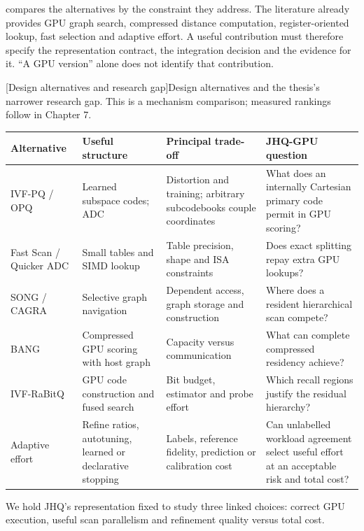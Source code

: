 compares the alternatives by the constraint they
address. The literature already provides GPU graph search, compressed
distance computation, register-oriented lookup, fast selection and adaptive
effort. A useful contribution must therefore specify the representation
contract, the integration decision and the evidence for it. ``A GPU version''
alone does not identify that contribution.

\par\medskip\noindent\begin{minipage}{\linewidth}
\centering\captionsetup{hypcap=false}
[Design alternatives and research gap]{Design alternatives and the thesis's narrower research gap.
This is a mechanism comparison; measured rankings follow in Chapter 7.}
\label{tab:2-position}
\footnotesize\setlength{\tabcolsep}{4pt}
\begin{tabularx}{\linewidth}{@{}>{\raggedright\arraybackslash}p{.20\linewidth}*{3}{>{\raggedright\arraybackslash}X}@{}}
\toprule
Alternative & Useful structure & Principal trade-off & JHQ-GPU question \\
\midrule
IVF-PQ / OPQ & Learned subspace codes; ADC & Distortion and training;
arbitrary subcodebooks couple coordinates & What does an internally
Cartesian primary code permit in GPU scoring? \\
Fast Scan / Quicker ADC & Small tables and SIMD lookup & Table precision,
shape and ISA constraints & Does exact splitting repay extra GPU lookups? \\
SONG / CAGRA & Selective graph navigation & Dependent access, graph
storage and construction & Where does a resident hierarchical scan compete? \\
BANG & Compressed GPU scoring with host graph & Capacity versus
communication & What can complete compressed residency achieve? \\
IVF-RaBitQ & GPU code construction and fused search & Bit budget,
estimator and probe effort & Which recall regions justify the residual hierarchy? \\
Adaptive effort & Refine ratios, autotuning, learned or declarative stopping
& Labels, reference fidelity, prediction or calibration cost & Can unlabelled
workload agreement select useful effort at an acceptable risk and total cost? \\
\bottomrule
\end{tabularx}
\end{minipage}\par\medskip

We hold JHQ's representation fixed to study three linked choices: correct GPU execution, useful scan parallelism and refinement quality versus total cost.

